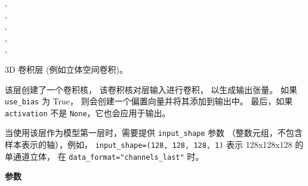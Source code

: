 \begin{Shaded}
\begin{Highlighting}[]
\OperatorTok{=}\NormalTok{(}\NormalTok{, }\NormalTok{, }\OperatorTok{=}, \\
\hspace{3cm}\OperatorTok{=}\OperatorTok{=}\NormalTok{(}\NormalTok{, }\NormalTok{, }\OperatorTok{=}, \\
\hspace{3cm}\OperatorTok{=}\OperatorTok{=}, \\
\hspace{3cm}\OperatorTok{=}\OperatorTok{=}, \\
\hspace{3cm}\OperatorTok{=}\OperatorTok{=}, \\
\hspace{3cm}\OperatorTok{=}\OperatorTok{=}\NormalTok{)}
\end{Highlighting}
\end{Shaded}

3D 卷积层 (例如立体空间卷积)。

该层创建了一个卷积核， 该卷积核对层输入进行卷积， 以生成输出张量。 如果
\texttt{use\_bias} 为 True， 则会创建一个偏置向量并将其添加到输出中。
最后，如果 \texttt{activation} 不是 \texttt{None}，它也会应用于输出。

当使用该层作为模型第一层时，需要提供 \texttt{input\_shape} 参数
（整数元组，不包含样本表示的轴），例如，
\texttt{input\_shape=(128,\ 128,\ 128,\ 1)} 表示 128x128x128
的单通道立体， 在 \texttt{data\_format="channels\_last"} 时。

\textbf{参数}

